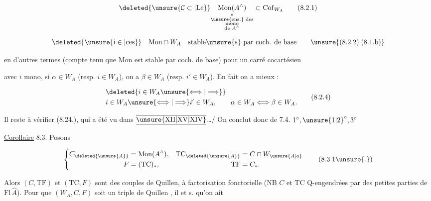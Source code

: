 \[
 \deleted{\unsure{\mathcal C\subset|\mathrm{Le}}}
 \underset{\substack{\shortparallel\\\text{\unsure{ens.} des}\\\text{mono}\\\text{de } A^\wedge}}
 {\mathrm{Mon}(A^\wedge)}\subset\mathrm{Cof}_{W_A}
 \tag*{(8.2.1)}
\]

\[
 \deleted{\unsure{\mathrm i\in|\mathrm{ces}}}\quad \mathrm{Mon}\cap W_A
 \quad\text{stable\unsure{s} par coch. de base}
 \tag*{\unsure{(8.2.2)|(8.1.b)}}
\]

en d'autres termes (compte tenu que Mon est stable par coch. de base) pour
un carré cocartésien


avec $i$ mono, si $\alpha\in W_A$ (resp. $i\in W_A$),
on a $\beta\in W_A$ (resp. $i'\in W_A$). En fait
on a mieux : 

\[
 \begin{aligned}
 &\deleted{i\in W_A\unsure{\Longleftrightarrow|\Longrightarrow}}\\
 &i\in W_A\unsure{\Longleftrightarrow|\Longrightarrow} i'\in W_A,\qquad
 \alpha\in W_A\Longleftrightarrow\beta\in W_A.
 \end{aligned}
 \tag*{(8.2.4)}
\]

Il reste à vérifier (8.24.), qui a été vu dans $\overline{\underline{\unsure{\mathrm{XII}|\mathrm{XV}|\mathrm{XIV}}}}$\ldots\quad / On conclut donc de 7.4. $1^\circ,\unsure{1|2}^\circ,3^\circ$

\uline{Corollaire} 8.3. Posons \unsure{\S|$\xi$}

\[
 \left\{\begin{aligned}
 C_{\deleted{\unsure{A}}}&=\mathrm{Mon}(A^\wedge),&
 \mathrm{TC}_{\deleted{\unsure{A}}}&=C\cap W_{\unsure{A|a}}\\
 F&=(\mathrm{TC})_\ast,&\mathrm{TF}&=C_\ast.
 \end{aligned}\right.
 \tag*{(8.3.1\unsure{.})}
\]

Alors $(C,\mathrm{TF})$ et $(\mathrm{TC},F)$ sont des couples
de Quillen, à factorisation fonctorielle (NB
$C$ et $\mathrm{TC}$   Q-engendrées  par des
petites parties de $\mathrm{Fl}\,\widehat A$). Pour que
$(W_A,C,F)$ soit un triple de Quillen ,
il  et s. qu'on ait


